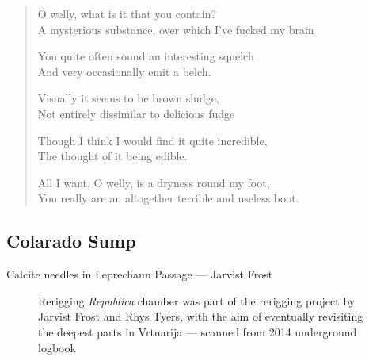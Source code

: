 \begin{verse}
\begin{centering}
 O welly, what is it that you contain?\\
A mysterious substance, over which I’ve fucked my brain

You quite often sound an interesting squelch\\
And very occasionally emit a belch.

Visually it seems to be brown sludge,\\
Not entirely dissimilar to delicious fudge

Though I think I would find it quite incredible,\\
The thought of it being edible.

All I want, O welly, is a dryness round my foot, \\
You really are an altogether terrible and useless boot.\\
 \end{centering}
\end{verse}

\subsection{Colarado Sump}
\begin{marginfigure}
\end{marginfigure}

       
\begin{marginfigure}
        \centering
        \caption{Calcite needles in Leprechaun Passage --- Jarvist Frost} \label{more calcite needles}
\end{marginfigure}

\begin{figure*}[t]
	\checkoddpage \ifoddpage \forcerectofloat \else \forceversofloat \fi
    		\centering
    
   		\caption{Rerigging \emph{Republica} chamber was part of the rerigging project by Jarvist Frost and Rhys Tyers, with the aim of eventually revisiting the deepest parts in Vrtnarija
    		 --- scanned from 2014 underground logbook}
		 \label{scan}
\end{figure*}
          
